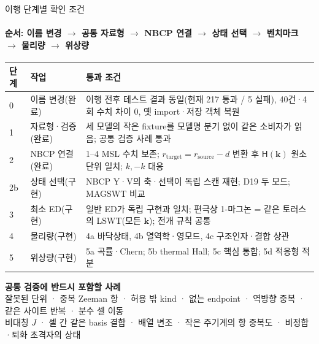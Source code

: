\begin{frame}[label=next-steps]{이행 단계별 확인 조건}
  \framesubtitle{순서: 이름 변경 $\to$ 공통 자료형 $\to$ NBCP 연결 $\to$ 상태 선택 $\to$ 벤치마크 $\to$ 물리량 $\to$ 위상량}
  \small\renewcommand{\arraystretch}{1.1}
  \begin{tabularx}{\textwidth}{@{}p{0.6cm}p{2.6cm}Y@{}}
    \toprule
    단계 & 작업 & 통과 조건 \\
     & 이름 변경(완료) & 이행 전후 테스트 결과 동일(현재 217 통과 / 5 실패), 40건·4회 수치 차이 0, 옛 import·저장 객체 복원 \\
    1 & 자료형·검증(완료) & 세 모델의 작은 fixture를 모델명 분기 없이 같은 소비자가 읽음; 공통 검증 사례 통과 \\
    2 & NBCP 연결(완료) & 1--4 MSL 수치 보존; $r_{\mathrm{target}}=r_{\mathrm{source}}-d$ 변환 후 $\mathsf H(\mathbf k)$ 원소 단위 일치; $k,-k$ 대응 \\
    2b & 상태 선택(구현) & NBCP Y·V의 축·선택이 독립 스캔 재현; D19 두 모드; MAGSWT 비교 \\
    3 & 최소 ED(구현) & 일반 ED가 독립 구현과 일치; 편극상 1-마그논 = 같은 토러스의 LSWT(모든 $\mathbf k$); 전개 규칙 공통 \\
    4 & 물리량(구현) & 4a 바닥상태, 4b 열역학·영모드, 4c 구조인자·결합 상관 \\
    5 & 위상량(구현) & 5a 곡률·Chern; 5b thermal Hall; 5c 핵심 통합; 5d 적응형 적분 \\
    \bottomrule
  \end{tabularx}
  \par\smallskip
  \textbf{공통 검증에 반드시 포함할 사례}\\[0.3em]
  잘못된 단위 · 중복 Zeeman 항 · 허용 밖 kind · 없는 endpoint · 역방향 중복 · 같은 사이트 반복 · 분수 셀 이동\\
  비대칭 $J$ · 셀 간 같은 basis 결합 · 배열 변조 · 작은 주기계의 항 중복도 · 비정합·퇴화 초격자의 상태
  \par\medskip
\end{frame}

